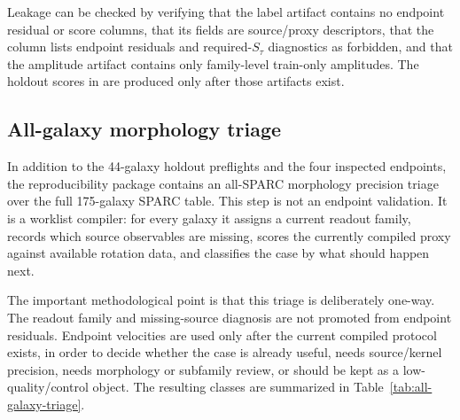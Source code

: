 \documentclass[11pt]{article}
\begin{document}
Leakage can be checked by verifying that the label artifact contains no
endpoint residual or score columns, that its  fields are
source/proxy descriptors, that the  column lists
endpoint residuals and required-\(S_\tau\) diagnostics as forbidden, and that
the amplitude artifact contains only family-level train-only amplitudes.  The
holdout scores in 
are produced only after those artifacts exist.

\subsection{All-galaxy morphology triage}

In addition to the 44-galaxy holdout preflights and the four inspected
endpoints, the reproducibility package contains an all-SPARC morphology
precision triage over the full 175-galaxy SPARC table.  This step is not an
endpoint validation.  It is a worklist compiler: for every galaxy it assigns a
current readout family, records which source observables are missing, scores the
currently compiled proxy against available rotation data, and classifies the
case by what should happen next.

The important methodological point is that this triage is deliberately
one-way.  The readout family and missing-source diagnosis are not promoted from
endpoint residuals.  Endpoint velocities are used only after the current
compiled protocol exists, in order to decide whether the case is already useful,
needs source/kernel precision, needs morphology or subfamily review, or should
be kept as a low-quality/control object.  The resulting classes are summarized
in Table~\ref{tab:all-galaxy-triage}.

\begin{table}[H]
\centering
\caption{All-SPARC morphology precision triage.  These 175 rows are a
source-acquisition and protocol-prioritization product, not endpoint
validation.}
\label{tab:all-galaxy-triage}
\small
{}
\end{table}
\end{document}
